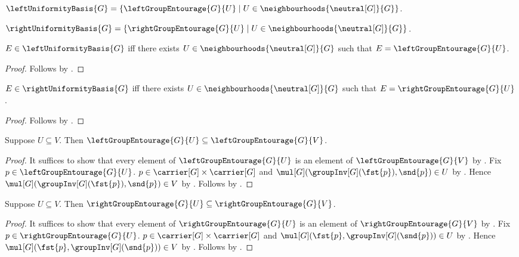 \begin{definition}\label{left_uniformity_basis}
    $\leftUniformityBasis{G}=
        \{\leftGroupEntourage{G}{U}\mid
            U\in\neighbourhoods{\neutral[G]}{G}\}$.
\end{definition}

\begin{definition}\label{right_uniformity_basis}
    $\rightUniformityBasis{G}=
        \{\rightGroupEntourage{G}{U}\mid
            U\in\neighbourhoods{\neutral[G]}{G}\}$.
\end{definition}

\begin{proposition}\label{left_uniformity_basis_iff}
    $E\in\leftUniformityBasis{G}$ iff there exists
        $U\in\neighbourhoods{\neutral[G]}{G}$ such that
        $E=\leftGroupEntourage{G}{U}$.
\end{proposition}
\begin{proof}
    Follows by .
\end{proof}

\begin{proposition}\label{right_uniformity_basis_iff}
    $E\in\rightUniformityBasis{G}$ iff there exists
        $U\in\neighbourhoods{\neutral[G]}{G}$ such that
        $E=\rightGroupEntourage{G}{U}$.
\end{proposition}
\begin{proof}
    Follows by .
\end{proof}

\begin{proposition}\label{left_group_entourage_monotone}
    Suppose $U\subseteq V$.
    Then $\leftGroupEntourage{G}{U}
        \subseteq\leftGroupEntourage{G}{V}$.
\end{proposition}
\begin{proof}
    It suffices to show that every element of $\leftGroupEntourage{G}{U}$
        is an element of $\leftGroupEntourage{G}{V}$ by .
    Fix $p\in\leftGroupEntourage{G}{U}$.
    $p\in\carrier[G]\times\carrier[G]$ and
        $\mul[G](\groupInv[G](\fst{p}),\snd{p})\in U$
        by .
    Hence $\mul[G](\groupInv[G](\fst{p}),\snd{p})\in V$
        by .
    Follows by .
\end{proof}

\begin{proposition}\label{right_group_entourage_monotone}
    Suppose $U\subseteq V$.
    Then $\rightGroupEntourage{G}{U}
        \subseteq\rightGroupEntourage{G}{V}$.
\end{proposition}
\begin{proof}
    It suffices to show that every element of $\rightGroupEntourage{G}{U}$
        is an element of $\rightGroupEntourage{G}{V}$ by .
    Fix $p\in\rightGroupEntourage{G}{U}$.
    $p\in\carrier[G]\times\carrier[G]$ and
        $\mul[G](\fst{p},\groupInv[G](\snd{p}))\in U$
        by .
    Hence $\mul[G](\fst{p},\groupInv[G](\snd{p}))\in V$
        by .
    Follows by .
\end{proof}

